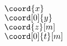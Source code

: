 \documentclass{article} %
\begin{document}
$\coord{x}$\\
$\coord[0]{y}$\\
$\coord{z}[m]$\\
$\coord[0]{t}[m]$\\
\end{document}
